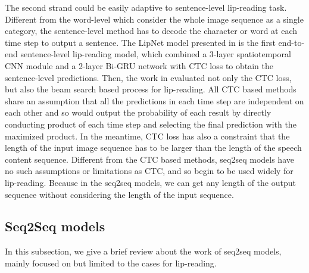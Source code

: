 \documentclass[a4paper, 10pt, conference]{ieeeconf}      %
\begin{document}
	The second strand could be easily adaptive to sentence-level lip-reading task. Different from the word-level which consider the whole image sequence as a single category, the sentence-level method has to decode the character or word at each time step to output a sentence. The LipNet model presented in \cite{Assael2016} is the first end-to-end sentence-level lip-reading model, which combined a 3-layer spatiotemporal CNN module and a 2-layer Bi-GRU network with CTC loss to obtain the sentence-level predictions. Then, the work in \cite{Afouras} evaluated not only the CTC loss, but also the beam search based process \cite{Wiseman2016} for lip-reading. All CTC based methods share an assumption that all the predictions in each time step are independent on each other and so would output the probability of each result by directly conducting product of each time step and selecting the final prediction with the maximized product. In the meantime, CTC loss has also a constraint that the length of the input image sequence has to be larger than the length of the speech content sequence. Different from the CTC based methods, seq2seq models have no such assumptions or limitations as CTC, and so begin to be used widely for lip-reading. Because in the seq2seq models, we can get any length of the output sequence without considering the length of the input sequence.
	
	\subsection{Seq2Seq models}
	In this subsection, we give a brief review about the work of seq2seq models, mainly focused on but limited to the cases for lip-reading. 
	
\end{document}
